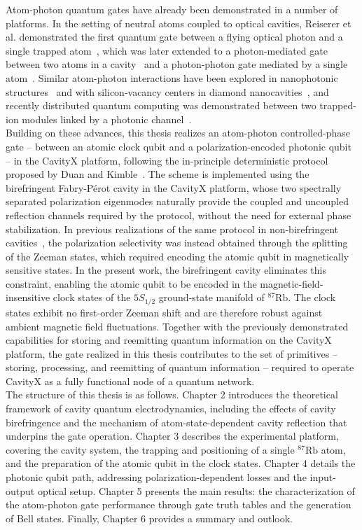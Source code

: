 Atom-photon quantum gates have already been demonstrated in a number of platforms. In the setting of neutral atoms coupled to optical cavities, Reiserer et al. demonstrated the first quantum gate between a flying optical photon and a single trapped atom~\cite{Reiserer2014}, which was later extended to a photon-mediated gate between two atoms in a cavity~\cite{Welte2018} and a photon-photon gate mediated by a single atom~\cite{Hacker2016}. Similar atom-photon interactions have been explored in nanophotonic structures~\cite{TieckeEtAl2014} and with silicon-vacancy centers in diamond nanocavities~\cite{Bhaskar2020}, and recently distributed quantum computing was demonstrated between two trapped-ion modules linked by a photonic channel~\cite{Drmota2025}. \\

Building on these advances, this thesis realizes an atom-photon controlled-phase gate -- between an atomic clock qubit and a polarization-encoded photonic qubit -- in the CavityX platform, following the in-principle deterministic protocol proposed by Duan and Kimble~\cite{DuanKimble2004}. The scheme is implemented using the birefringent Fabry-Pérot cavity in the CavityX platform, whose two spectrally separated polarization eigenmodes naturally provide the coupled and uncoupled reflection channels required by the protocol, without the need for external phase stabilization. In previous realizations of the same protocol in non-birefringent cavities~\cite{Reiserer2014}, the polarization selectivity was instead obtained through the splitting of the Zeeman states, which required encoding the atomic qubit in magnetically sensitive states. In the present work, the birefringent cavity eliminates this constraint, enabling the atomic qubit to be encoded in the magnetic-field-insensitive clock states of the $5S_{1/2}$ ground-state manifold of $^{87}\text{Rb}$. The clock states exhibit no first-order Zeeman shift and are therefore robust against ambient magnetic field fluctuations. Together with the previously demonstrated capabilities for storing and reemitting quantum information on the CavityX platform, the gate realized in this thesis contributes to the set of primitives -- storing, processing, and reemitting of quantum information -- required to operate CavityX as a fully functional node of a quantum network. \\

The structure of this thesis is as follows. Chapter 2 introduces the theoretical framework of cavity quantum electrodynamics, including the effects of cavity birefringence and the mechanism of atom-state-dependent cavity reflection that underpins the gate operation. Chapter 3 describes the experimental platform, covering the cavity system, the trapping and positioning of a single $^{87}\text{Rb}$ atom, and the preparation of the atomic qubit in the clock states. Chapter 4 details the photonic qubit path, addressing polarization-dependent losses and the input-output optical setup. Chapter 5 presents the main results: the characterization of the atom-photon gate performance through gate truth tables and the generation of Bell states. Finally, Chapter 6 provides a summary and outlook.

